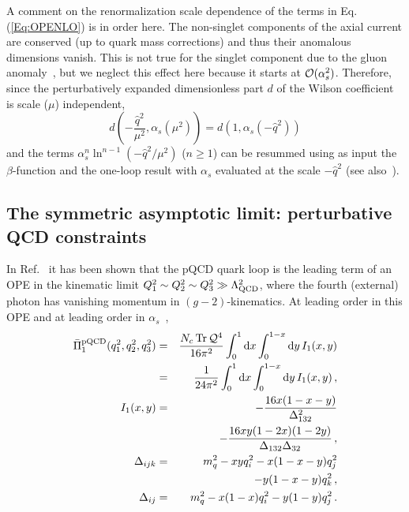 A comment on the renormalization scale dependence of the terms in Eq.(\ref{Eq:OPENLO}) is in order here. The non-singlet components of the axial current are conserved (up to quark mass corrections) and thus their anomalous dimensions vanish. This is not true for the singlet component due to the gluon anomaly~\cite{Espriu:1982bw, Bos:1992nd}, but we neglect this effect here because it starts at $\mathcal{O}(\alpha_s^2)$. Therefore, since the perturbatively expanded dimensionless part $d$ of the Wilson coefficient is scale ($\mu$) independent,
\begin{equation}
d\left(-\frac{\hat{q}^2}{\mu^2}, \alpha_s(\mu^2)\right) = d(1, \alpha_s(-\hat{q}^2)) 
\end{equation}
and the terms $\alpha_s^n \ln^{n-1} (-\hat{q}^2/\mu^2)$ ($n\ge 1$) can be resummed using as input the $\beta$-function and the one-loop result with $\alpha_s$ evaluated at the scale $-\hat{q}^2$ (see also~\cite{Narison:1992fd}).


\subsection{The symmetric asymptotic limit: perturbative QCD constraints}
\label{Sec:pQCD}
In Ref.~\cite{Bijnens} it has been shown that the pQCD quark loop is the leading term of an OPE in the kinematic limit $Q_1^2 \sim Q_2^2 \sim Q_3^2 \gg \Lambda_\text{QCD}^2$, where the fourth (external) photon has vanishing momentum in $(g-2)$-kinematics. At leading order in this OPE and at leading order in $\alpha_s$~\cite{BernSDCLong}, 
\begin{eqnarray}
\bar{\Pi}_1^\text{pQCD} (q_1^2, q_2^2, q_3^2) & = & \frac{N_c \tr \Q^4}{16\pi^2} \int_{0}^{1} \dif x \int_{0}^{1-x} \dif y \, I_1(x,y) \nonumber \\
& = & \frac{1}{24\pi^2} \int_{0}^{1} \dif x \int_{0}^{1-x} \dif y\,  I_1(x,y)\,, \nonumber \allowdisplaybreaks\\
I_1(x,y) & = & -\frac{16 x(1-x-y)}{\Delta_{132}^2} \nonumber\\
&&- \frac{16 x y(1-2x)(1-2y)}{\Delta_{132} \Delta_{32}}\,, \nonumber \\
\Delta_{ijk} & = & m_q^2-xy q_i^2 -x(1-x-y)q_j^2 \nonumber \\
&&- y(1-x-y) q_k^2\,, \nonumber \\
\Delta_{ij} & = & m_q^2-x(1-x)q_i^2 - y(1-y) q_j^2\,.
\label{Eq:pQCDIntegral}
\end{eqnarray}


